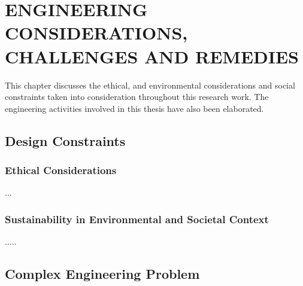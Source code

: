 \chapter{ENGINEERING CONSIDERATIONS, CHALLENGES
AND REMEDIES}\label{anotherchapter}
\vspace{-3em}

This chapter discusses the ethical, and environmental considerations and social constraints taken into consideration throughout this research work. The engineering activities involved in this thesis have also been elaborated. 

\section{Design Constraints}

\subsection{Ethical Considerations}

...



 \subsection{Sustainability in Environmental and Societal Context}

.....


\section{Complex Engineering Problem}
